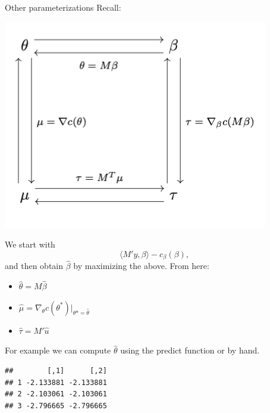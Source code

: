 \documentclass[
  ignorenonframetext,
]{beamer}
\newenvironment{Shaded}{\begin{snugshade}}{\end{snugshade}}
\newcommand{\AttributeTok}[1]{\textcolor[rgb]{0.77,0.63,0.00}{#1}}
\newcommand{\DecValTok}[1]{\textcolor[rgb]{0.00,0.00,0.81}{#1}}
\newcommand{\FunctionTok}[1]{\textcolor[rgb]{0.00,0.00,0.00}{#1}}
\newcommand{\NormalTok}[1]{#1}
\newcommand{\OtherTok}[1]{\textcolor[rgb]{0.56,0.35,0.01}{#1}}
\newcommand{\SpecialCharTok}[1]{\textcolor[rgb]{0.00,0.00,0.00}{#1}}
\newcommand{\StringTok}[1]{\textcolor[rgb]{0.31,0.60,0.02}{#1}}
\providecommand{\tightlist}{%
  \setlength{\itemsep}{0pt}\setlength{\parskip}{0pt}}
\begin{document}
\begin{frame}{Other parameterizations}
\protect\hypertarget{other-parameterizations}{}
Recall:

\includegraphics{transformations.png}
\end{frame}

\begin{frame}[fragile]{}
\protect\hypertarget{section-14}{}
We start with \[
  \langle M'y, \beta \rangle - c_\beta(\beta),
\] and then obtain \(\hat{\beta}\) by maximizing the above. From here:

\begin{itemize}
\tightlist
\item
  \(\hat{\theta} = M\hat{\beta}\)
\item
  \(\hat\mu = \nabla_\theta c(\theta^*)|_{\theta* = \hat{\theta}}\)
\item
  \(\hat\tau = M'\hat{u}\)
\end{itemize}

\vspace{12pt}

For example we can compute \(\hat\theta\) using the predict function or
by hand. \vspace{12pt} \tiny

\begin{Shaded}
\end{Shaded}

\begin{verbatim}
##        [,1]      [,2]
## 1 -2.133881 -2.133881
## 2 -2.103061 -2.103061
## 3 -2.796665 -2.796665
\end{verbatim}
\end{frame}
\end{document}
